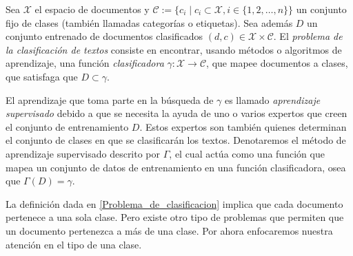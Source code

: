 \documentclass{llncs}
\begin{document}
	\begin{definition} \label{Problema_de_clasificacion}
		Sea $\mathcal{{X}}$ el espacio de documentos y $\mathcal{C} := \{c_i \mid c_i \subset \mathcal{X}, i \in \{ 1,2,\dots,n\} \}$ un conjunto fijo de clases (tambi\'en llamadas categor\'ias o etiquetas). Sea adem\'as $D$ un conjunto entrenado de documentos clasificados $(d,c) \in \mathcal X \times \mathcal{C}$. El \emph{problema de la clasificaci\'on de textos} consiste en encontrar, usando m\'etodos o algoritmos de aprendizaje, una funci\'on \emph{clasificadora} $\gamma : \mathcal{X} \rightarrow \mathcal{C}$, que mapee documentos a clases, que satisfaga que $D \subset \gamma$. 	

	\end{definition}
	
	El aprendizaje que toma parte en la b\'usqueda de $\gamma$ es llamado \emph{aprendizaje supervisado} debido a que se necesita la ayuda de uno o varios expertos que creen el conjunto de entrenamiento $D$. Estos expertos son  tambi\'en quienes determinan el conjunto de clases en que se clasificar\'an los textos. Denotaremos el m\'etodo de aprendizaje supervisado descrito por $\Gamma$, el cual act\'ua como una funci\'on que mapea un conjunto de datos de entrenamiento en una funci\'on clasificadora, osea que $\Gamma(D) = \gamma$.
	
	La definici\'on dada en \ref{Problema_de_clasificacion} implica que cada documento pertenece a una sola clase. Pero existe otro tipo de problemas que permiten que un documento pertenezca a m\'as de una clase. Por ahora enfocaremos nuestra atenci\'on en el tipo de una clase.
	
\end{document}
